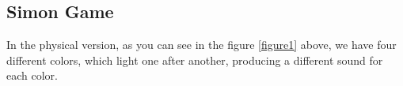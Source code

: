 \documentclass[12pt, openany, twocolumn]{article}
\begin{document}




    \subsection{Simon Game}
    In the physical version, as you can see in the figure \ref{figure1} above, we have four different colors, which light one after another, producing a different sound for each color.
    \\
\end{document}
